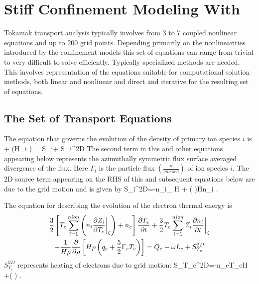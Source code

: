 \section{Stiff Confinement Modeling With \ot} 

Tokamak transport analysis typically involves from 3 to 7 coupled nonlinear 
equations and up to 200 grid points. Depending primarily on the nonlinearities
introduced by the confinement models this set of equations can range from
trivial to very difficult to solve efficiently. Typically specialized methods
are needed. This involves representation of the equations suitable for 
computational solution methods, both linear and nonlinear and direct and
iterative for the resulting set of equations.

\subsection{The Set of Transport Equations}

The equation that governs the evolution of  the density of primary ion species
$i$  is
\beq
 +\ddiff{\rho} \big(H\rho\Gamma_i
 \big) =
 S_i+ S_i^{2D} \color{blue}\label{eq:ni_app}
\eeq
The second term in this and other equations appearing below represents the
azimuthally symmetric flux surface averaged divergence of the flux. Here
$\Gamma_i $ is the particle flux $\left(\frac{\#}{cm^2sec}\right)$ of ion  species $i$.
The 2D source term appearing on the RHS of this and  subsequent equations below
are due to the grid motion and is given by 
\beq
 S_i^{2D}=-n_i\bigg \vert_{\zeta} \ln H +  \left (
 \right )\ddiff{\rho}Hn_i .
\eeq

The equation for describing the evolution of the electron thermal energy is 
\begin{multline} 
 \frac{3}{2}\left[T_e\sum_{i=1}^{nion}\left(n_i\frac{\partial{Z_i}}{\partial{ T_e}}\bigg \vert_{\zeta}\right) + n_e
 \right]\frac{\partial{ T_e}}{\partial{ t}} 
 +\frac{3}{2}T_e \sum_{i=1}^{nion}Z_i\frac{\partial{n_i}}{\partial{ t}}\bigg \vert_{\zeta}\\
 +\frac{1}{H\rho}\frac{\partial}{\partial \rho}\left[H\rho \left(
 q_e+\frac{5}{2}\Gamma_e T_e\right) \right]
 =Q_e  -\omega L_e +  S^{2D}_{T_e} 
 \label{eq:eeng}
\end{multline}
$S_{T_e}^{2D}$ represents heating of electrons due to grid motion:
\beq
 S_{T_e}^{2D}=-n_eT_e\ln H 
 +\left ( \right )
 \Bigg[ \frac{5}{2}n_eT_e \pdiff {\ln H} {\rho} \\
 +\frac{3}{2}T_e\sum_{i=1}^{nion}Z_I\pdiff{n_i}{\rho} 
 +\frac{3}{2} \left(n_e+T_e\sum_{i=1}^{nion} n_z\pdiff{Z_i}{T_e}
 \right)\pdiff{T_e}{\rho} \Bigg].
\eeq


